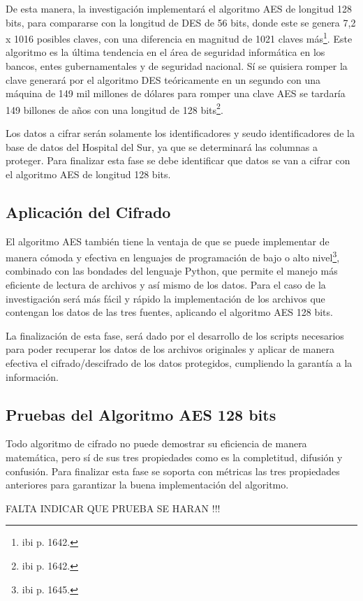 \documentclass[a4paper,openright,12pt]{book}
\theoremstyle{definition}
\theoremstyle{remark}
\begin{document}
De esta manera, la investigación implementará el algoritmo AES de longitud 128 bits, para compararse con la longitud de DES de 56 bits, donde este se genera 7,2 x 1016 posibles claves, con una diferencia en magnitud de 1021 claves más\footnote{ibi p. 1642.}. Este algoritmo es la última tendencia en el área de seguridad informática en los bancos, entes gubernamentales y de seguridad nacional. Sí se quisiera romper la clave generará por el algoritmo DES teóricamente en un segundo con una máquina de 149 mil millones de dólares para romper una clave AES se tardaría 149 billones de años con una longitud de 128 bits\footnote{ibi p. 1642.}.

Los datos a cifrar serán solamente los identificadores y seudo identificadores de la base de datos del Hospital del Sur, ya que  se determinará las columnas a proteger. Para finalizar esta fase se debe identificar que datos se van a cifrar con el algoritmo AES de longitud 128 bits.

     \subsection{Aplicación del Cifrado}
     El algoritmo AES también tiene la ventaja de que se puede implementar de manera cómoda y efectiva en lenguajes de programación de bajo o alto nivel\footnote{ibi p. 1645.}, combinado con las bondades del lenguaje Python, que permite el manejo más eficiente de lectura de archivos y así mismo de los datos. Para el caso de la investigación será más fácil y rápido la implementación de los archivos que contengan los datos de las tres fuentes, aplicando el algoritmo AES 128 bits.
     
La finalización de esta fase, será dado por el desarrollo de los scripts necesarios para poder recuperar los datos de los archivos originales y aplicar de manera efectiva el cifrado/descifrado de los datos protegidos, cumpliendo la garantía a la información. 
     
	\subsection{Pruebas del Algoritmo AES 128 bits}
Todo algoritmo de cifrado no puede demostrar su eficiencia de manera matemática, pero sí de sus tres propiedades como es la completitud, difusión y confusión. Para finalizar esta fase se soporta con métricas las tres propiedades anteriores para garantizar la buena implementación del algoritmo. 

FALTA INDICAR QUE PRUEBA SE HARAN !!!
     
\end{document}
